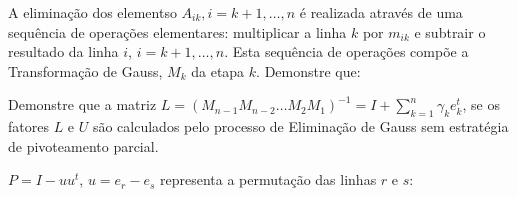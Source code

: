 \documentclass[a4paper,12pt, leqno, answers]{exam}
\begin{document}
\thispagestyle{headandfoot}
\begin{questions}
    \question A elimina\c{c}\~{a}o dos elementso $A_{ik}, i = k + 1, \ldots, n$ \'{e} realizada atrav\'{e}s de uma sequ\^{e}ncia de opera\c{c}\~{o}es elementares: multiplicar a linha $k$ por $m_{ik}$ e subtrair o resultado da linha $i$, $i = k + 1, \ldots, n$. Esta sequ\^{e}ncia de opera\c{c}\~{o}es comp\~{o}e a Transforma\c{c}\~{a}o de Gauss, $M_k$ da etapa $k$. Demonstre que:

    \question Demonstre que a matriz $L = \left( M_{n - 1} M_{n - 2} \ldots M_2 M_1 \right)^{-1} = I + \sum_{k = 1}^n \gamma_k e_k^t$, se os fatores $L$ e $U$ s\~{a}o calculados pelo processo de Elimina\c{c}\~{a}o de Gauss sem estrat\'{e}gia de pivoteamento parcial.
    \begin{solution}
        
    \end{solution}

    \question $P = I - u u^t$, $u = e_r - e_s$ representa a permuta\c{c}\~{a}o das linhas $r$ e $s$:
\end{questions}
\end{document}
